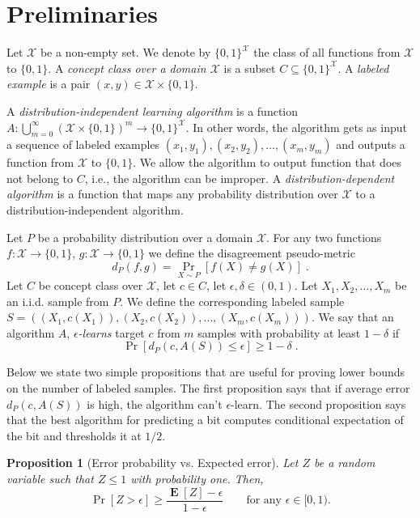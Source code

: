 \documentclass[10pt]{article}
\newtheorem{proposition}{Proposition}
\newcommand{\X}{\mathcal{X}}
\DeclareMathOperator{\Exp}{\mathbf{E}}
\begin{document}
\section{Preliminaries}

Let $\X$ be a non-empty set. We denote by $\{0,1\}^\X$ the class of all
functions from $\X$ to $\{0,1\}$. A \emph{concept class over a domain $\X$} is a
subset $C \subseteq \{0,1\}^\X$. A \emph{labeled example} is a pair $(x,y) \in
\X \times \{0,1\}$.

A \emph{distribution-independent learning algorithm} is a function
$A:\bigcup_{m=0}^\infty \left(\X \times \{0,1\} \right)^m \to \{0,1\}^\X$. In
other words, the algorithm gets as input a sequence of labeled examples $(x_1,
y_1), (x_2, y_2), \dots, (x_m, y_m)$ and outputs a function from $\X$ to
$\{0,1\}$. We allow the algorithm to output function that does not belong to
$C$, i.e., the algorithm can be improper. A \emph{distribution-dependent algorithm}
is a function that maps any probability distribution over $\X$ to a
distribution-independent algorithm.

Let $P$ be a probability distribution over a domain $\X$. For any two functions
$f:\X \to \{0,1\}$, $g:\X \to \{0,1\}$ we define the disagreement pseudo-metric
$$
d_P(f,g) = \Pr_{X \sim P}[f(X) \neq g(X)] \; .
$$
Let $C$ be concept class over $\X$, let $c \in C$, let $\epsilon, \delta \in (0,1)$.
Let  $X_1, X_2, \dots, X_m$ be an i.i.d. sample from $P$. We define the corresponding
labeled sample $S = ((X_1, c(X_1)), (X_2, c(X_2)), \dots, (X_m, c(X_m)))$.
We say that an algorithm $A$, \emph{$\epsilon$-learns} target $c$ from $m$ samples
with probability at least $1 - \delta$ if
$$
\Pr \left[d_P(c,A(S)) \le \epsilon \right]  \ge 1 - \delta \; .
$$

Below we state two simple propositions that are useful for proving lower bounds
on the number of labeled samples. The first proposition says that if average
error $d_P(c,A(S))$ is high, the algorithm can't $\epsilon$-learn. The second
proposition says that the best algorithm for predicting a bit computes
conditional expectation of the bit and thresholds it at $1/2$.

\begin{proposition}[Error probability vs. Expected error]
\label{proposition:error-probability-vs-expected-error}
Let $Z$ be a random variable such that $Z \le 1$ with probability one.
Then,
$$
\Pr[Z > \epsilon] \ge \frac{\Exp[Z] - \epsilon}{1 - \epsilon} \qquad \text{for any $\epsilon \in [0, 1)$.}
$$
\end{proposition}
\end{document}
